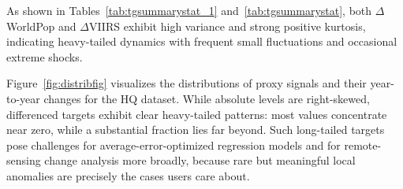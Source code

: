 \documentclass[preprint,12pt]{elsarticle}
\begin{document}
As shown in Tables~\ref{tab:tgsummarystat_1} and~\ref{tab:tgsummarystat}, both $\Delta$WorldPop and $\Delta$VIIRS exhibit high variance and strong positive kurtosis, indicating heavy-tailed dynamics with frequent small fluctuations and occasional extreme shocks.


\begin{table}[htbp]
    \centering
    \caption{Target summary statistics (part 1)}
    \label{tab:tgsummarystat_1}
\end{table}
\vspace{-0.4cm}
\begin{table}[htbp]
    \centering
    \caption{Target summary statistics}
    \label{tab:tgsummarystat}
\end{table}

Figure~\ref{fig:distribfig} visualizes the distributions of proxy signals and their year-to-year changes for the HQ dataset. While absolute levels are right-skewed, differenced targets exhibit clear heavy-tailed patterns: most values concentrate near zero, while a substantial fraction lies far beyond. Such long-tailed targets pose challenges for average-error-optimized regression models and for remote-sensing change analysis more broadly, because rare but meaningful local anomalies are precisely the cases users care about.
\end{document}
